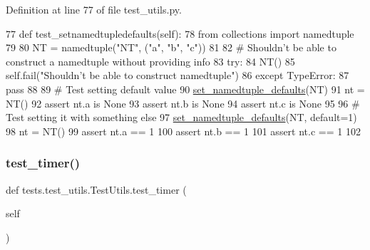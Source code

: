 Definition at line 77 of file test\+\_\+utils.\+py.


\begin{DoxyCode}
77     \textcolor{keyword}{def }test\_setnamedtupledefaults(self):
78         \textcolor{keyword}{from} collections \textcolor{keyword}{import} namedtuple
79 
80         NT = namedtuple(\textcolor{stringliteral}{"NT"}, (\textcolor{stringliteral}{"a"}, \textcolor{stringliteral}{"b"}, \textcolor{stringliteral}{"c"}))
81 
82         \textcolor{comment}{# Shouldn't be able to construct a namedtuple without providing info}
83         \textcolor{keywordflow}{try}:
84             NT()
85             self.fail(\textcolor{stringliteral}{"Shouldn't be able to construct namedtuple"})
86         \textcolor{keywordflow}{except} TypeError:
87             \textcolor{keywordflow}{pass}
88 
89         \textcolor{comment}{# Test setting default value}
90         \hyperlink{namespaceparlai_1_1agents_1_1legacy__agents_1_1seq2seq_1_1utils__v1_a17553492abb2e671bc3fc58e1e3a96b0}{set\_namedtuple\_defaults}(NT)
91         nt = NT()
92         \textcolor{keyword}{assert} nt.a \textcolor{keywordflow}{is} \textcolor{keywordtype}{None}
93         \textcolor{keyword}{assert} nt.b \textcolor{keywordflow}{is} \textcolor{keywordtype}{None}
94         \textcolor{keyword}{assert} nt.c \textcolor{keywordflow}{is} \textcolor{keywordtype}{None}
95 
96         \textcolor{comment}{# Test setting it with something else}
97         \hyperlink{namespaceparlai_1_1agents_1_1legacy__agents_1_1seq2seq_1_1utils__v1_a17553492abb2e671bc3fc58e1e3a96b0}{set\_namedtuple\_defaults}(NT, default=1)
98         nt = NT()
99         \textcolor{keyword}{assert} nt.a == 1
100         \textcolor{keyword}{assert} nt.b == 1
101         \textcolor{keyword}{assert} nt.c == 1
102 
\end{DoxyCode}
\mbox{\label{classtests_1_1test__utils_1_1TestUtils_aa4b5f19e38d6da7a8947226c60007184}} 
\subsubsection{\texorpdfstring{test\+\_\+timer()}{test\_timer()}}
{\footnotesize\ttfamily def tests.\+test\+\_\+utils.\+Test\+Utils.\+test\+\_\+timer (\begin{DoxyParamCaption}\item[{}]{self }\end{DoxyParamCaption})}



